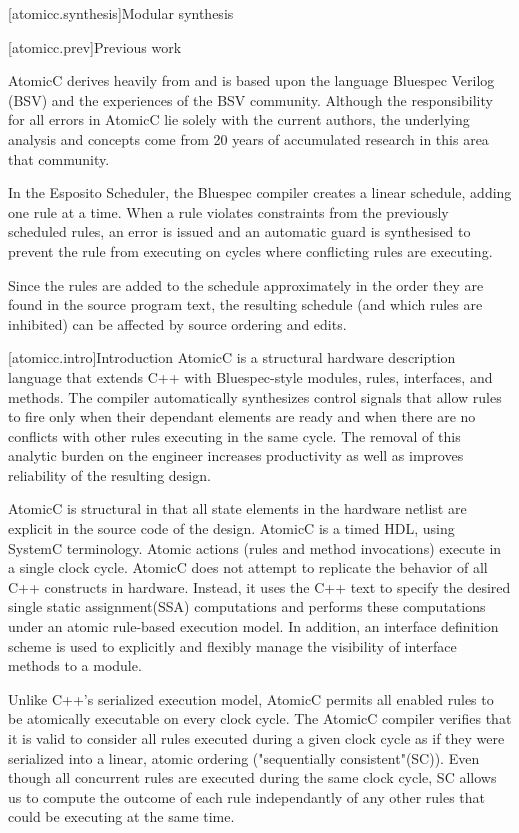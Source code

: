 [atomicc.synthesis]{Modular synthesis}

[atomicc.prev]{Previous work}

AtomicC derives heavily from and is based upon the language Bluespec Verilog (BSV)
and the experiences of the BSV community.  Although the responsibility for all
errors in AtomicC lie solely with the current authors, the underlying analysis and
concepts come from 20 years of accumulated research in this area that community.

In the Esposito Scheduler\cite{Esposito:Patent},
the Bluespec compiler creates a linear schedule, adding
one rule at a time.  When a rule violates constraints from the previously scheduled
rules, an error is issued and an automatic guard is synthesised to prevent the
rule from executing on cycles where conflicting rules are executing.

Since the rules are added to the schedule approximately in the order they are
found in the source program text, the resulting schedule (and which rules are
inhibited) can be affected by source ordering and edits.

[atomicc.intro]{Introduction}
AtomicC is a structural hardware description language that extends C++
with Bluespec-style\cite{Bluespec:www,Hoe:Thesis,HoeArvind:TRS_Synthesis2}
modules, rules, interfaces, and methods.
The compiler automatically synthesizes control signals that allow rules to fire
only when their dependant elements are ready and when there are no conflicts with
other rules executing in the same cycle.  The removal of this analytic burden on
the engineer increases productivity as well as improves reliability of the
resulting design.

AtomicC is structural in that all state elements in the hardware
netlist are explicit in the source code of the design. AtomicC is a
timed HDL, using SystemC terminology. 
Atomic actions (rules and method invocations) execute in a single clock cycle.
AtomicC does not attempt to replicate the behavior of all C++ constructs in hardware.
Instead, it uses the C++ text to specify the desired single static assignment(SSA) computations
and performs these computations under an atomic rule-based execution model.
In addition, an interface definition scheme is used to explicitly and flexibly
manage the visibility of interface methods to a module.

Unlike C++'s serialized execution model, AtomicC permits all enabled rules to be atomically executable on
every clock cycle.  The AtomicC compiler verifies that it is valid to consider
all rules executed during a given clock cycle
as if they were serialized into a linear, atomic ordering ("sequentially consistent"(SC)).
Even though all concurrent rules are executed during the same clock cycle, SC allows us to compute the
outcome of each rule independantly of any other rules that could be executing at the same time.

